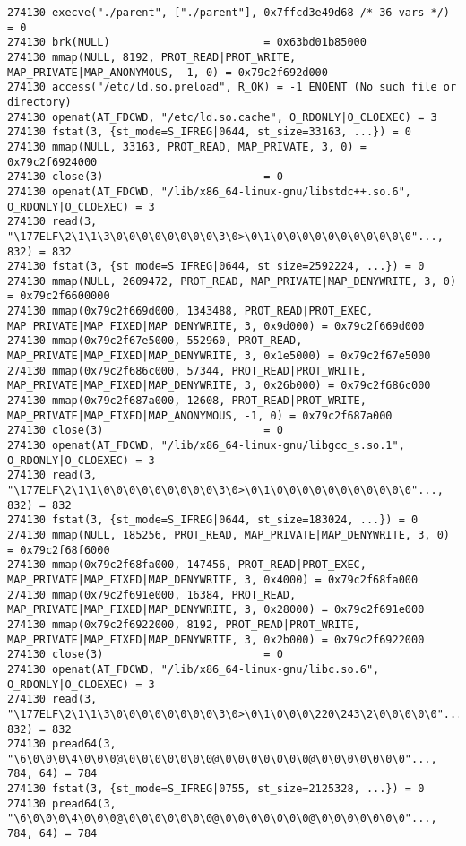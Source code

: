 \begin{verbatim}
274130 execve("./parent", ["./parent"], 0x7ffcd3e49d68 /* 36 vars */) = 0
274130 brk(NULL)                        = 0x63bd01b85000
274130 mmap(NULL, 8192, PROT_READ|PROT_WRITE, MAP_PRIVATE|MAP_ANONYMOUS, -1, 0) = 0x79c2f692d000
274130 access("/etc/ld.so.preload", R_OK) = -1 ENOENT (No such file or directory)
274130 openat(AT_FDCWD, "/etc/ld.so.cache", O_RDONLY|O_CLOEXEC) = 3
274130 fstat(3, {st_mode=S_IFREG|0644, st_size=33163, ...}) = 0
274130 mmap(NULL, 33163, PROT_READ, MAP_PRIVATE, 3, 0) = 0x79c2f6924000
274130 close(3)                         = 0
274130 openat(AT_FDCWD, "/lib/x86_64-linux-gnu/libstdc++.so.6", O_RDONLY|O_CLOEXEC) = 3
274130 read(3, "\177ELF\2\1\1\3\0\0\0\0\0\0\0\0\3\0>\0\1\0\0\0\0\0\0\0\0\0\0\0"..., 832) = 832
274130 fstat(3, {st_mode=S_IFREG|0644, st_size=2592224, ...}) = 0
274130 mmap(NULL, 2609472, PROT_READ, MAP_PRIVATE|MAP_DENYWRITE, 3, 0) = 0x79c2f6600000
274130 mmap(0x79c2f669d000, 1343488, PROT_READ|PROT_EXEC, MAP_PRIVATE|MAP_FIXED|MAP_DENYWRITE, 3, 0x9d000) = 0x79c2f669d000
274130 mmap(0x79c2f67e5000, 552960, PROT_READ, MAP_PRIVATE|MAP_FIXED|MAP_DENYWRITE, 3, 0x1e5000) = 0x79c2f67e5000
274130 mmap(0x79c2f686c000, 57344, PROT_READ|PROT_WRITE, MAP_PRIVATE|MAP_FIXED|MAP_DENYWRITE, 3, 0x26b000) = 0x79c2f686c000
274130 mmap(0x79c2f687a000, 12608, PROT_READ|PROT_WRITE, MAP_PRIVATE|MAP_FIXED|MAP_ANONYMOUS, -1, 0) = 0x79c2f687a000
274130 close(3)                         = 0
274130 openat(AT_FDCWD, "/lib/x86_64-linux-gnu/libgcc_s.so.1", O_RDONLY|O_CLOEXEC) = 3
274130 read(3, "\177ELF\2\1\1\0\0\0\0\0\0\0\0\0\3\0>\0\1\0\0\0\0\0\0\0\0\0\0\0"..., 832) = 832
274130 fstat(3, {st_mode=S_IFREG|0644, st_size=183024, ...}) = 0
274130 mmap(NULL, 185256, PROT_READ, MAP_PRIVATE|MAP_DENYWRITE, 3, 0) = 0x79c2f68f6000
274130 mmap(0x79c2f68fa000, 147456, PROT_READ|PROT_EXEC, MAP_PRIVATE|MAP_FIXED|MAP_DENYWRITE, 3, 0x4000) = 0x79c2f68fa000
274130 mmap(0x79c2f691e000, 16384, PROT_READ, MAP_PRIVATE|MAP_FIXED|MAP_DENYWRITE, 3, 0x28000) = 0x79c2f691e000
274130 mmap(0x79c2f6922000, 8192, PROT_READ|PROT_WRITE, MAP_PRIVATE|MAP_FIXED|MAP_DENYWRITE, 3, 0x2b000) = 0x79c2f6922000
274130 close(3)                         = 0
274130 openat(AT_FDCWD, "/lib/x86_64-linux-gnu/libc.so.6", O_RDONLY|O_CLOEXEC) = 3
274130 read(3, "\177ELF\2\1\1\3\0\0\0\0\0\0\0\0\3\0>\0\1\0\0\0\220\243\2\0\0\0\0\0"..., 832) = 832
274130 pread64(3, "\6\0\0\0\4\0\0\0@\0\0\0\0\0\0\0@\0\0\0\0\0\0\0@\0\0\0\0\0\0\0"..., 784, 64) = 784
274130 fstat(3, {st_mode=S_IFREG|0755, st_size=2125328, ...}) = 0
274130 pread64(3, "\6\0\0\0\4\0\0\0@\0\0\0\0\0\0\0@\0\0\0\0\0\0\0@\0\0\0\0\0\0\0"..., 784, 64) = 784

\end{verbatim}
